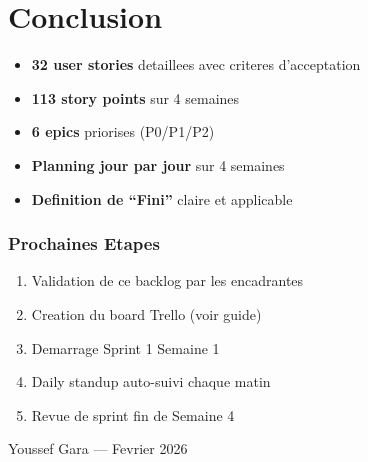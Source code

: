 ﻿\documentclass[12pt,a4paper]{report}
\begin{document}
\chapter*{Conclusion}

\begin{itemize}
    \item \textbf{32 user stories} detaillees avec criteres d'acceptation
    \item \textbf{113 story points} sur 4 semaines
    \item \textbf{6 epics} priorises (P0/P1/P2)
    \item \textbf{Planning jour par jour} sur 4 semaines
    \item \textbf{Definition de ``Fini''} claire et applicable
\end{itemize}

\subsection*{Prochaines Etapes}
\begin{enumerate}
    \item Validation de ce backlog par les encadrantes
    \item Creation du board Trello (voir guide)
    \item Demarrage Sprint 1 Semaine 1
    \item Daily standup auto-suivi chaque matin
    \item Revue de sprint fin de Semaine 4
\end{enumerate}

\vspace{2cm}
\begin{center}
Youssef Gara --- Fevrier 2026
\end{center}
\end{document}
